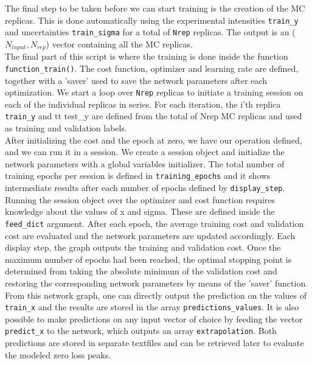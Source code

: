 The final step to be taken before we can start training is the creation of the MC replicas.
%
This is done automatically using the experimental intensities {\tt train\_y} and uncertainties
{\tt train\_sigma} for a total of {\tt Nrep} replicas. The output is an ($N_{input}, N_{rep}$) 
vector containing all the MC replicas. \\

The final part of this script is where the training is done inside the function {\tt function\_train()}. 
%
The cost function, optimizer and learning rate are defined, together with a 'saver' used to 
save the network parameters after each optimization. 
%
We start a loop over {\tt Nrep} replicas to initiate a training session on each of the individual replicas
in series. 
%
For each iteration, the i'th replica {\tt train\_y} and {tt test\_y} are defined from the total of Nrep 
MC replicas and used as training and validation labels. 
%
\\

After initializing the cost and the epoch at zero, we have our operation defined, and we can run it in a session. 
%
We create a session object and initialize the network parameters with a global variables initializer.
%
The total number of training epochs per session is defined in {\tt training\_epochs} and it shows intermediate 
results after each number of epochs defined by {\tt display\_step}. 
%
Running the session object over the optimizer and cost function requires knowledge about the values of x and sigma. 
These are defined inside the {\tt feed\_dict} argument. 
%
After each epoch, the average training cost and validation cost are evaluated and the network parameters 
are updated accordingly.
%
Each display step, the graph outputs the training and validation cost. Once the maximum number of epochs 
had been reached, the optimal stopping point is determined from taking the absolute minimum of the validation cost
and restoring the corresponding network parameters by means of the 'saver' function.
%
From this network graph, one can directly output the prediction on the values of {\tt train\_x} and
the results are stored in the array {\tt predictions\_values}.
%
It is also possible to make predictions on any input vector of choice by feeding the vector {\tt predict\_x} to the 
network, which outputs an array {\tt extrapolation}.
%
Both predictions are stored in separate textfiles and can be retrieved later to evaluate the modeled zero loss peaks.




